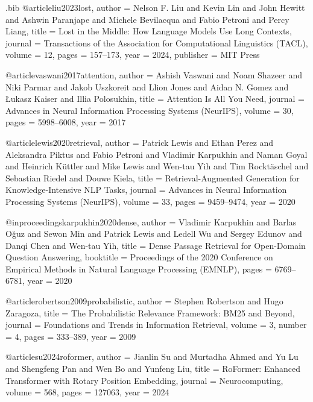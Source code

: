 \begin{filecontents*}{\jobname.bib}
@article{liu2023lost,
  author    = {Nelson F. Liu and Kevin Lin and John Hewitt and Ashwin Paranjape and Michele Bevilacqua and Fabio Petroni and Percy Liang},
  title     = {Lost in the Middle: How Language Models Use Long Contexts},
  journal   = {Transactions of the Association for Computational Linguistics (TACL)},
  volume    = {12},
  pages     = {157--173},
  year      = {2024},
  publisher = {MIT Press}
}

@article{vaswani2017attention,
  author    = {Ashish Vaswani and Noam Shazeer and Niki Parmar and Jakob Uszkoreit and Llion Jones and Aidan N. Gomez and {\L}ukasz Kaiser and Illia Polosukhin},
  title     = {Attention Is All You Need},
  journal   = {Advances in Neural Information Processing Systems (NeurIPS)},
  volume    = {30},
  pages     = {5998--6008},
  year      = {2017}
}

@article{lewis2020retrieval,
  author    = {Patrick Lewis and Ethan Perez and Aleksandra Piktus and Fabio Petroni and Vladimir Karpukhin and Naman Goyal and Heinrich K{\"{u}}ttler and Mike Lewis and Wen-tau Yih and Tim Rockt{\"{a}}schel and Sebastian Riedel and Douwe Kiela},
  title     = {Retrieval-Augmented Generation for Knowledge-Intensive {NLP} Tasks},
  journal   = {Advances in Neural Information Processing Systems (NeurIPS)},
  volume    = {33},
  pages     = {9459--9474},
  year      = {2020}
}

@inproceedings{karpukhin2020dense,
  author    = {Vladimir Karpukhin and Barlas O{\u{g}}uz and Sewon Min and Patrick Lewis and Ledell Wu and Sergey Edunov and Danqi Chen and Wen-tau Yih},
  title     = {Dense Passage Retrieval for Open-Domain Question Answering},
  booktitle = {Proceedings of the 2020 Conference on Empirical Methods in Natural Language Processing (EMNLP)},
  pages     = {6769--6781},
  year      = {2020}
}

@article{robertson2009probabilistic,
  author    = {Stephen Robertson and Hugo Zaragoza},
  title     = {The Probabilistic Relevance Framework: {BM25} and Beyond},
  journal   = {Foundations and Trends in Information Retrieval},
  volume    = {3},
  number    = {4},
  pages     = {333--389},
  year      = {2009}
}

@article{su2024roformer,
  author    = {Jianlin Su and Murtadha Ahmed and Yu Lu and Shengfeng Pan and Wen Bo and Yunfeng Liu},
  title     = {RoFormer: Enhanced Transformer with Rotary Position Embedding},
  journal   = {Neurocomputing},
  volume    = {568},
  pages     = {127063},
  year      = {2024}
}


\end{filecontents*}
